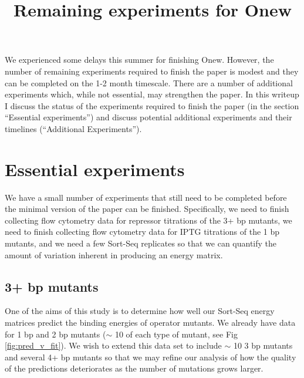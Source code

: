 \documentclass[10pt,letterpaper]{article}
\begin{document}
\title{Remaining experiments for Onew}
\maketitle

We experienced some delays this summer for finishing Onew. However, the number of remaining experiments required to finish the paper is modest and they can be completed on the 1-2 month timescale. There are a number of additional experiments which, while not essential, may strengthen the paper. In this writeup I discuss the status of the experiments required to finish the paper (in the section ``Essential experiments'') and discuss potential additional experiments and their timelines (``Additional Experiments'').

\section*{Essential experiments}

We have a small number of experiments that still need to be completed before the
minimal version of the paper can be finished. Specifically, we need to finish
collecting flow cytometry data for repressor titrations of the 3+ bp mutants,
we need to finish collecting flow cytometry data for IPTG titrations of the 1 bp
mutants, and we need a few Sort-Seq replicates so that we can quantify the
amount of variation inherent in producing an energy matrix.

\subsection*{3+ bp mutants}
One of the aims of this study is to determine how well our Sort-Seq energy
matrices predict the binding energies of operator mutants. We already have data
for 1 bp and 2 bp mutants ($\sim$ 10 of each type of mutant, see Fig
\ref{fig:pred_v_fit}). We wish to extend this data set to include $\sim$ 10 3
bp mutants and several 4+ bp mutants so that we may refine our analysis of how
the quality of the predictions deteriorates as the number of mutations grows
larger.\\
\end{document}
